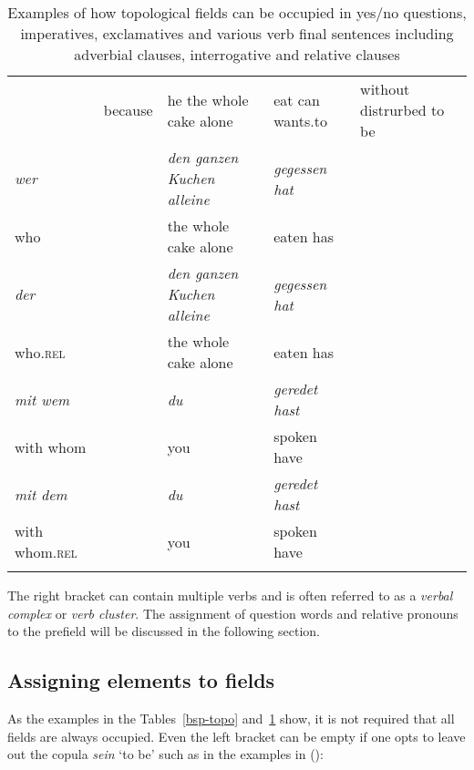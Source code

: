 \begin{table}
{\begin{tabular}{l@{~}l@{~}l@{~}l@{~}l}
        & because       & he the whole cake alone           & eat can wants.to    & without distrurbed to be\\\tablevspace
%
\emph{wer}     &               & \emph{den ganzen Kuchen alleine}                  & \emph{gegessen hat} \\
who     &               & the whole cake alone              & eaten has\\\tablevspace
%
\emph{der}     &               & \emph{den ganzen Kuchen alleine}                  & \emph{gegessen hat} \\
who.\textsc{rel}     &               & the whole cake alone              & eaten has\\\tablevspace
%
\emph{mit wem} &               & \emph{du}                                     & \emph{geredet hast}\\
with whom &             & you                                    & spoken have\\\tablevspace
%
\emph{mit dem} &               & \emph{du}                                     & \emph{geredet hast}\\
with whom.\textsc{rel} &             & you                                    & spoken have\\
\lspbottomrule
\end{tabular}
}
\caption{\label{bsp-topo-two}Examples of how topological fields can be occupied in yes/no questions,
  imperatives, exclamatives and various verb final sentences including adverbial clauses,
  interrogative and relative clauses}
\end{table}
The right bracket can contain multiple verbs and is often referred to as a \emph{verbal complex} or \emph{verb cluster}.
The assignment of question words and relative pronouns to the prefield will be discussed in the following section.

\subsection{Assigning elements to fields}

As the examples in the Tables~\ref{bsp-topo} and~\ref{bsp-topo-two} show, it is not required that all fields are always occupied. Even the left bracket can be empty if one opts to leave out
the copula \emph{sein} `to be' such as in the examples in ():
\eal
\ex

